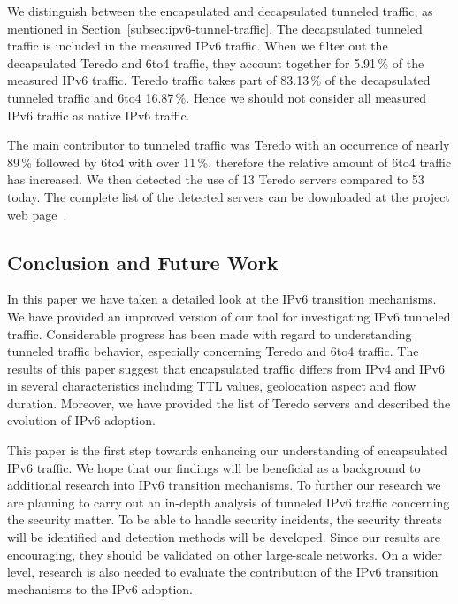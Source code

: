 We distinguish between the encapsulated and decapsulated tunneled traffic, as mentioned in Section~\ref{subsec:ipv6-tunnel-traffic}. The decapsulated tunneled traffic is included in the measured IPv6 traffic. When we filter out the decapsulated Teredo and 6to4 traffic, they account together for 5.91\,\% of the measured IPv6 traffic. Teredo traffic takes part of 83.13\,\% of the decapsulated tunneled traffic and 6to4 16.87\,\%. Hence we should not consider all measured IPv6 traffic as native IPv6 traffic.

The main contributor to tunneled traffic was Teredo with an occurrence of nearly 89\,\% followed by 6to4 with over 11\,\%, therefore the relative amount of 6to4 traffic has increased. We then detected the use of 13 Teredo servers compared to 53 today. The complete list of the detected servers can be downloaded at the project web page~\cite{web}. 

\subsection{Conclusion and Future Work} \label{subsec:ipv6-tunnels-conclusion}

In this paper we have taken a detailed look at the IPv6 transition mechanisms. We have provided an improved version of our tool for investigating IPv6 tunneled traffic. Considerable progress has been made with regard to understanding tunneled traffic behavior, especially concerning Teredo and 6to4 traffic. The results of this paper suggest that encapsulated traffic differs from IPv4 and IPv6 in several characteristics including TTL values, geolocation aspect and flow duration. Moreover, we have provided the list of Teredo servers and described the evolution of IPv6 adoption.

This paper is the first step towards enhancing our understanding of encapsulated IPv6 traffic. We hope that our findings will be beneficial as a background to additional research into IPv6 transition mechanisms. To further our research we are planning to carry out an in-depth analysis of tunneled IPv6 traffic concerning the security matter. To be able to handle security incidents, the security threats will be identified and detection methods will be developed. Since our results are encouraging, they should be validated on other large-scale networks. On a wider level, research is also needed to evaluate the contribution of the IPv6 transition mechanisms to the IPv6 adoption.



